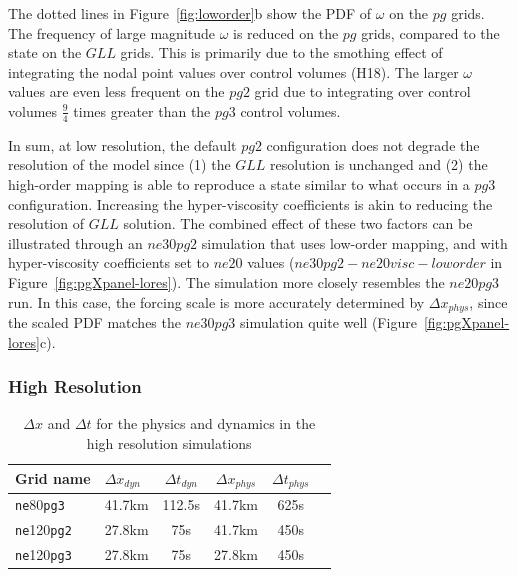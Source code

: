 \documentclass{agujournal}
\begin{document}
The dotted lines in Figure~\ref{fig:loworder}b show the PDF of $\omega$ on the $pg$ grids. The frequency of large magnitude $\omega$ is reduced on the $pg$ grids, compared to the state on the $GLL$ grids. This is primarily due to the smothing effect of integrating the nodal point values over control volumes (H18). The larger $\omega$ values are even less frequent on the $pg2$ grid due to integrating over control volumes $\frac{9}{4}$ times greater than the $pg3$ control volumes. 

In sum, at low resolution, the default $pg2$ configuration does not degrade the resolution of the model since (1) the $GLL$ resolution is unchanged and (2) the high-order mapping is able to reproduce a state similar to what occurs in a $pg3$ configuration. Increasing the hyper-viscosity coefficients is akin to reducing the resolution of $GLL$ solution. The combined effect of these two factors can be illustrated through an $ne30pg2$ simulation that uses low-order mapping, and with hyper-viscosity coefficients set to $ne20$ values ($ne30pg2-ne20visc-loworder$ in Figure~\ref{fig:pgXpanel-lores}). The simulation more closely resembles the $ne20pg3$ run. In this case, the forcing scale is more accurately determined by $\Delta x_{phys}$, since the scaled PDF matches the $ne30pg3$ simulation quite well (Figure~\ref{fig:pgXpanel-lores}c).




\subsubsection{High Resolution}\label{sec:hires}

 \begin{table}
 \caption{$\Delta x$ and $\Delta t$ for the physics and dynamics in the high resolution simulations}
 \centering
 \begin{tabular}{llcccc}
 \hline
 Grid name & $\Delta x_{dyn}$  & $\Delta t_{dyn}$ & $\Delta x_{phys}$  & $\Delta t_{phys}$ \\
 \hline
   {\tt{ne}}80{\tt{pg3}}  & 41.7km & 112.5s  & 41.7km & 625s \\
   {\tt{ne}}120{\tt{pg2}}  & 27.8km & 75s  & 41.7km & 450s \\
   {\tt{ne}}120{\tt{pg3}}  & 27.8km & 75s  & 27.8km & 450s \\
 \hline
 \end{tabular}
 \label{table:grids-hi}
 \end{table}
\end{document}
